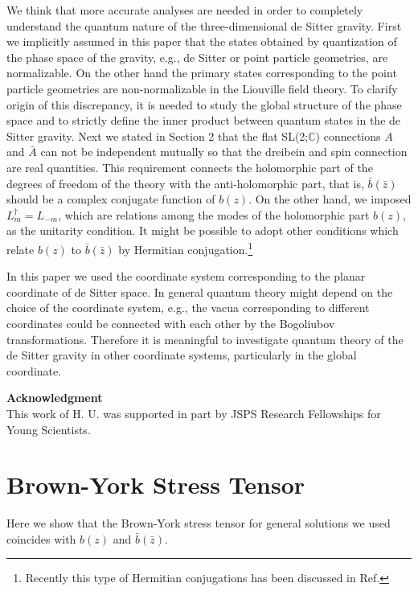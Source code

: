\documentclass[a4paper,11pt]{article}
\renewcommand{\theequation}{\thesection.\arabic{equation}}
\begin{document}
We think that more accurate analyses are needed in order to 
completely understand the quantum nature of the three-dimensional 
de Sitter gravity. 
First we implicitly assumed in this paper that 
the states obtained by quantization of the phase space of the gravity, 
e.g., de Sitter or point particle geometries,  
are normalizable.
On the other hand the primary states corresponding 
to the point particle geometries are non-normalizable
in the Liouville field theory.
To clarify origin of this discrepancy, it is needed 
to study the global structure of the phase space and 
to strictly define the inner product between quantum states 
in the de Sitter gravity.
Next we stated in Section 2 that the flat SL(2;$\mathbb{C}$) 
connections $A$ and $\bar{A}$ can not be independent mutually 
so that the dreibein and spin connection are real quantities.
This requirement connects the holomorphic part of the degrees 
of freedom of the theory with the anti-holomorphic part, that is, 
$\bar{b}(\bar{z})$ should be a complex conjugate function of $b(z)$.
On the other hand, we imposed $L_m^\dagger =L_{-m}$, 
which are relations among the modes of the holomorphic part $b(z)$,  
as the unitarity condition.
It might be possible to adopt other conditions 
which relate $b(z)$ to $\bar{b}(\bar{z})$ 
by Hermitian conjugation.\footnote{
Recently this type of Hermitian conjugations has been discussed 
in Ref.\cite{BBM2}}

In this paper we used the coordinate system corresponding to 
the planar coordinate of de Sitter space.
In general quantum theory might depend on the choice of 
the coordinate system, 
e.g., the vacua corresponding to different coordinates could be 
connected with each other by the Bogoliubov transformations.
Therefore it is meaningful to investigate quantum theory of 
the de Sitter gravity in other coordinate systems, particularly 
in the global coordinate.



\vspace{10mm}
\noindent
{\bf \large Acknowledgment} \\
This work of H. U. was supported in part by JSPS Research Fellowships 
for Young Scientists.


\renewcommand{\theequation}{\Alph{section}.\arabic{equation}}
\appendix

\section{Brown-York Stress Tensor}
Here we show that the Brown-York stress tensor \cite{Brown-York}
for general solutions we used coincides with 
$b(z)$ and $\bar{b}(\bar{z})$.
\end{document}
